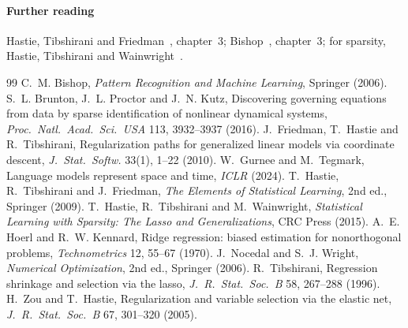 \documentclass[11pt]{article}
\begin{document}
\paragraph{Further reading} Hastie, Tibshirani and Friedman~\cite{hastie2009}, chapter~3; Bishop~\cite{bishop2006},
chapter~3; for sparsity, Hastie, Tibshirani and Wainwright~\cite{hastie2015}.

\begin{thebibliography}{99}\small
{} C.~M. Bishop, \emph{Pattern Recognition and Machine Learning}, Springer (2006).
 S.~L. Brunton, J.~L. Proctor and J.~N. Kutz, Discovering governing equations from data by sparse identification of nonlinear dynamical systems, \emph{Proc.\ Natl.\ Acad.\ Sci.\ USA} 113, 3932--3937 (2016).
 J.~Friedman, T.~Hastie and R.~Tibshirani, Regularization paths for generalized linear models via coordinate descent, \emph{J.\ Stat.\ Softw.} 33(1), 1--22 (2010).
 W.~Gurnee and M.~Tegmark, Language models represent space and time, \emph{ICLR} (2024).
 T.~Hastie, R.~Tibshirani and J.~Friedman, \emph{The Elements of Statistical Learning}, 2nd ed., Springer (2009).
 T.~Hastie, R.~Tibshirani and M.~Wainwright, \emph{Statistical Learning with Sparsity: The Lasso and Generalizations}, CRC Press (2015).
 A.~E. Hoerl and R.~W. Kennard, Ridge regression: biased estimation for nonorthogonal problems, \emph{Technometrics} 12, 55--67 (1970).
 J.~Nocedal and S.~J. Wright, \emph{Numerical Optimization}, 2nd ed., Springer (2006).
 R.~Tibshirani, Regression shrinkage and selection via the lasso, \emph{J.\ R.\ Stat.\ Soc.\ B} 58, 267--288 (1996).
 H.~Zou and T.~Hastie, Regularization and variable selection via the elastic net, \emph{J.\ R.\ Stat.\ Soc.\ B} 67, 301--320 (2005).
\end{thebibliography}

\SourceNote
\end{document}

